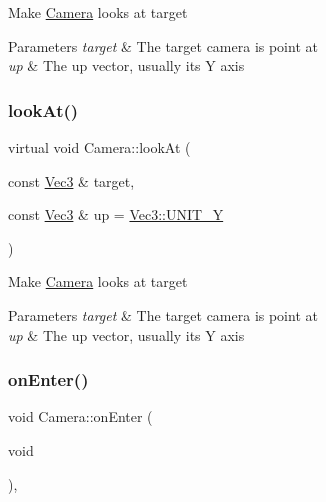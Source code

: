 Make \hyperlink{classCamera}{Camera} looks at target


\begin{DoxyParams}{Parameters}
{\em target} & The target camera is point at \\
\hline
{\em up} & The up vector, usually it\textquotesingle{}s Y axis \\
\hline
\end{DoxyParams}
\mbox{\label{classCamera_a0eca5fae6b9b7a1ad949d9647e48ca52}} 
\subsubsection{\texorpdfstring{look\+At()}{lookAt()}\hspace{0.1cm}{\footnotesize\ttfamily [2/2]}}
{\footnotesize\ttfamily virtual void Camera\+::look\+At (\begin{DoxyParamCaption}\item[{const \hyperlink{classVec3}{Vec3} \&}]{target,  }\item[{const \hyperlink{classVec3}{Vec3} \&}]{up = {\ttfamily \hyperlink{classVec3_a0d569defe7293f1cb108f643230facf5}{Vec3\+::\+U\+N\+I\+T\+\_\+Y}} }\end{DoxyParamCaption})\hspace{0.3cm}{\ttfamily [virtual]}}

Make \hyperlink{classCamera}{Camera} looks at target


\begin{DoxyParams}{Parameters}
{\em target} & The target camera is point at \\
\hline
{\em up} & The up vector, usually it\textquotesingle{}s Y axis \\
\hline
\end{DoxyParams}
\mbox{\label{classCamera_a6d316bcfec816212b0f3cfdf1b41b820}} 
\subsubsection{\texorpdfstring{on\+Enter()}{onEnter()}\hspace{0.1cm}{\footnotesize\ttfamily [1/2]}}
{\footnotesize\ttfamily void Camera\+::on\+Enter (\begin{DoxyParamCaption}\item[{void}]{ }\end{DoxyParamCaption})\hspace{0.3cm}{\ttfamily [override]}, {\ttfamily [virtual]}}


